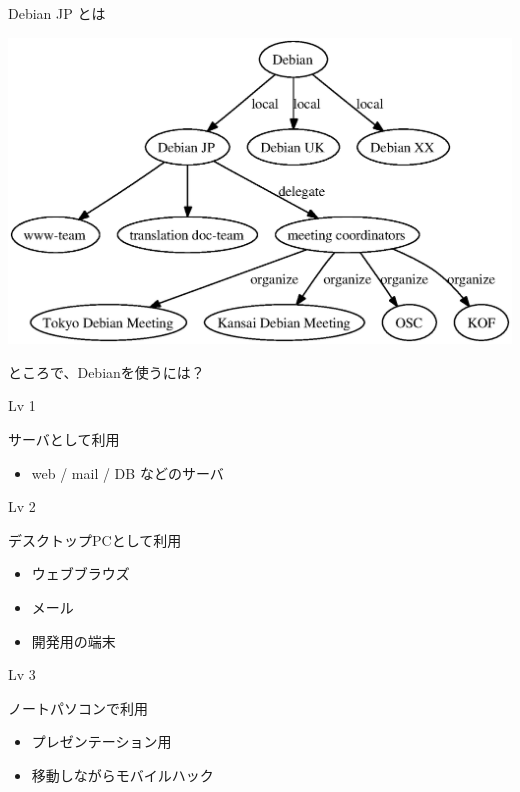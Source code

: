\documentclass[cjk,dvipdfmx,12pt]{beamer}
\begin{document}
\begin{frame}{Debian JP とは}

\includegraphics[width=0.8\hsize]{image200610/debianstructure.eps}
\end{frame}

\begin{frame}{}

ところで、Debianを使うには？

\end{frame}

\begin{frame}{Lv 1}

サーバとして利用

\begin{itemize}
 \item web / mail / DB などのサーバ
\end{itemize}
\end{frame}

\begin{frame}{Lv 2}
 
デスクトップPCとして利用

\begin{itemize}
 \item ウェブブラウズ
 \item メール
 \item 開発用の端末
\end{itemize}

\end{frame}

\begin{frame}{Lv 3}

ノートパソコンで利用
\begin{itemize}
 \item プレゼンテーション用
 \item 移動しながらモバイルハック
\end{itemize}
\end{frame}
\end{document}
